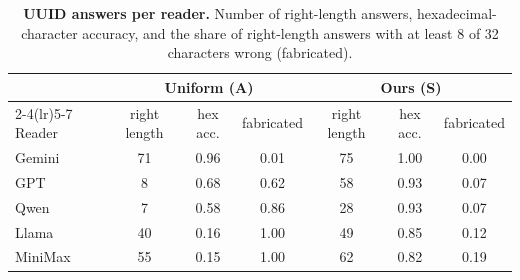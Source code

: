 \begin{table}[!htbp]
\centering
\caption{\textbf{UUID answers per reader.} Number of right-length answers, hexadecimal-character accuracy, and the share of right-length answers with at least 8 of 32 characters wrong (fabricated).}
\label{tab:app_anatomy_rd}
\footnotesize
\setlength{\tabcolsep}{3pt}
\begin{tabular}{l ccc ccc}
\toprule
& \multicolumn{3}{c}{Uniform (A)} & \multicolumn{3}{c}{Ours (S)} \\
\cmidrule(lr){2-4}\cmidrule(lr){5-7}
Reader & right length & hex acc. & fabricated & right length & hex acc. & fabricated \\
\midrule
Gemini & 71 & 0.96 & 0.01 & 75 & 1.00 & 0.00 \\
GPT & 8 & 0.68 & 0.62 & 58 & 0.93 & 0.07 \\
Qwen & 7 & 0.58 & 0.86 & 28 & 0.93 & 0.07 \\
Llama & 40 & 0.16 & 1.00 & 49 & 0.85 & 0.12 \\
MiniMax & 55 & 0.15 & 1.00 & 62 & 0.82 & 0.19 \\
\bottomrule
\end{tabular}
\end{table}
